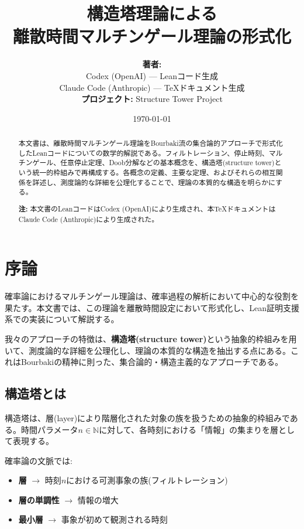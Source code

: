 \documentclass[a4paper,12pt]{ltjsarticle}
\title{構造塔理論による\\離散時間マルチンゲール理論の形式化}
\author{%
  \textbf{著者:}\\[0.5em]
  Codex (OpenAI) --- Leanコード生成\\
  Claude Code (Anthropic) --- \TeX{}ドキュメント生成\\[1em]
  \textbf{プロジェクト:} Structure Tower Project
}
\date{\today}
\theoremstyle{definition}
\begin{document}
\maketitle

\begin{abstract}
本文書は、離散時間マルチンゲール理論をBourbaki流の集合論的アプローチで形式化したLeanコードについての数学的解説である。フィルトレーション、停止時刻、マルチンゲール、任意停止定理、Doob分解などの基本概念を、構造塔(structure tower)という統一的枠組みで再構成する。各概念の定義、主要な定理、およびそれらの相互関係を詳述し、測度論的な詳細を公理化することで、理論の本質的な構造を明らかにする。

\textbf{注:} 本文書のLeanコードはCodex (OpenAI)により生成され、本\TeX{}ドキュメントはClaude Code (Anthropic)により生成された。
\end{abstract}

\tableofcontents
\clearpage

\section{序論}

確率論におけるマルチンゲール理論は、確率過程の解析において中心的な役割を果たす。本文書では、この理論を離散時間設定において形式化し、Lean証明支援系での実装について解説する。

我々のアプローチの特徴は、\textbf{構造塔(structure tower)}という抽象的枠組みを用いて、測度論的な詳細を公理化し、理論の本質的な構造を抽出する点にある。これはBourbakiの精神に則った、集合論的・構造主義的なアプローチである。

\subsection{構造塔とは}

構造塔は、層(layer)により階層化された対象の族を扱うための抽象的枠組みである。時間パラメータ$n \in \mathbb{N}$に対して、各時刻における「情報」の集まりを層として表現する。

確率論の文脈では:
\begin{itemize}
  \item \textbf{層} $\to$ 時刻$n$における可測事象の族(フィルトレーション)
  \item \textbf{層の単調性} $\to$ 情報の増大
  \item \textbf{最小層} $\to$ 事象が初めて観測される時刻
\end{itemize}
\end{document}
